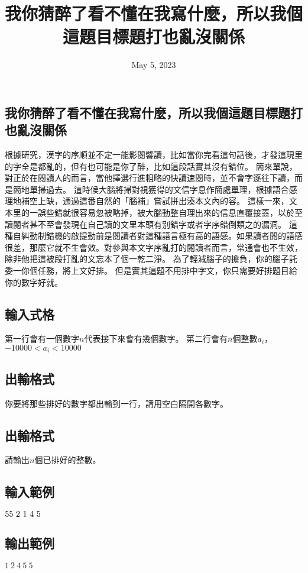 \documentclass{article}
\title{我你猜醉了看不懂在我寫什麼，所以我個這題目標題打也亂沒關係}
\date{May 5, 2023}
\begin{document}
\begin{CJK*}{UTF8}{bsmi}

\maketitle

\section*{我你猜醉了看不懂在我寫什麼，所以我個這題目標題打也亂沒關係}

根據研究，漢字的序順並不定一能影閱響讀，比如當你完看這句話後，才發這現里的字全是都亂的，但有也可能是你了醉，比如這段話實其沒有錯位。
簡來單說，對正於在閱讀人的而言，當他擇選行進粗略的快讀速閱時，並不會字逐往下讀，而是簡地單掃過去。
這時候大腦將掃對視獲得的文信字息作簡處單理，根據語合感理地補空上缺，通過這番自然的「腦補」嘗試拼出湊本文內的容。
這樣一來，文本里的一誤些錯就很容易忽被略掉，被大腦動整自理出來的信息直覆接蓋，以於至讀閱者甚不至會發現在自己讀的文里本頭有别錯字或者字序錯倒類之的漏洞。
這種自糾動制錯機的啟提動前是閱讀者對這種語言極有高的語感。如果讀者閱的語感很差，那麼它就不生會效。對參與本文字序亂打的閱讀者而言，常通會也不生效，除非他把這被段打亂的文忘本了個一乾二淨。
為了輕減腦子的擔負，你的腦子託委一你個任務，將上文好排。
但是實其這題不用排中字文，你只需要好排題目給你的數字好就。

\subsection*{輸入式格}
第一行會有一個數字$n$代表接下來會有幾個數字。
第二行會有$n$個整數$a_i$，$-10000<a_i<10000$
\subsection*{出輸格式}
你要將那些排好的數字都出輸到一行，請用空白隔開各數字。

\subsection*{出輸格式}
請輸出$n$個已排好的整數。

\subsection*{輸入範例}
$5\\5\ 2\ 1\ 4\ 5$
\subsection*{輸出範例}
$1\ 2\ 4\ 5\ 5$

\end{CJK*}
\end{document}
